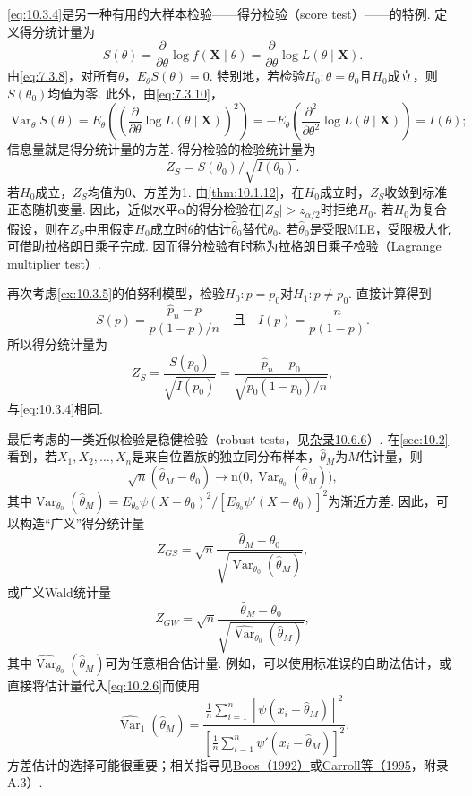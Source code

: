 \eqref{eq:10.3.4}是另一种有用的大样本检验——得分检验（score test）——的特例. 定义得分统计量为
$$S(\theta)=\frac\partial{\partial\theta}\log f(\boldsymbol X\mid\theta)=\frac\partial{\partial\theta}\log L(\theta\mid\boldsymbol X).$$
由\eqref{eq:7.3.8}，对所有$\theta$，$E_\theta S(\theta)=0$. 特别地，若检验$H_0:\theta=\theta_0$且$H_0$成立，则$S(\theta_0)$均值为零. 此外，由\eqref{eq:7.3.10}，
$$\operatorname{Var}_\theta S(\theta)=E_\theta\left(\left(\frac\partial{\partial\theta}\log L(\theta\mid\boldsymbol X)\right)^2\right)
=-E_\theta\left(\frac{\partial^2}{\partial\theta^2}\log L(\theta\mid\boldsymbol X)\right)=I(\theta);$$
信息量就是得分统计量的方差. 得分检验的检验统计量为
$$Z_S=S(\theta_0)/\sqrt{I(\theta_0)}.$$
若$H_0$成立，$Z_S$均值为0、方差为1. 由\autoref{thm:10.1.12}，在$H_0$成立时，$Z_S$收敛到标准正态随机变量. 因此，近似水平$\alpha$的得分检验在$|Z_S|>z_{\alpha/2}$时拒绝$H_0$. 若$H_0$为复合假设，则在$Z_S$中用假定$H_0$成立时$\theta$的估计$\hat\theta_0$替代$\theta_0$. 若$\hat\theta_0$是受限MLE，受限极大化可借助拉格朗日乘子完成. 因而得分检验有时称为拉格朗日乘子检验（Lagrange multiplier test）.

\begin{example}[二项得分检验]\label{ex:10.3.6}
再次考虑\autoref{ex:10.3.5}的伯努利模型，检验$H_0:p=p_0$对$H_1:p\ne p_0$. 直接计算得到
$$S(p)=\frac{\hat p_n-p}{p(1-p)/n}\quad\text{且}\quad I(p)=\frac n{p(1-p)}.$$
所以得分统计量为
$$Z_S=\frac{S(p_0)}{\sqrt{I(p_0)}}=\frac{\hat p_n-p_0}{\sqrt{p_0(1-p_0)/n}},$$
与\eqref{eq:10.3.4}相同.
\end{example}

最后考虑的一类近似检验是稳健检验（robust tests，见\hyperref[sec:10.6.6]{杂录10.6.6}）. 在\autoref{sec:10.2}看到，若$X_1,X_2,\ldots,X_n$是来自位置族的独立同分布样本，$\hat\theta_M$为$M$估计量，则
\begin{equation}\label{eq:10.3.5}
\sqrt n(\hat\theta_M-\theta_0)\longrightarrow\mathrm n\bigl(0,\operatorname{Var}_{\theta_0}(\hat\theta_M)\bigr),
\end{equation}
其中$\operatorname{Var}_{\theta_0}(\hat\theta_M)=E_{\theta_0}\psi(X-\theta_0)^2/[E_{\theta_0}\psi'(X-\theta_0)]^2$为渐近方差. 因此，可以构造“广义”得分统计量
$$Z_{GS}=\sqrt n\frac{\hat\theta_M-\theta_0}{\sqrt{\operatorname{Var}_{\theta_0}(\hat\theta_M)}},$$
或广义Wald统计量
$$Z_{GW}=\sqrt n\frac{\hat\theta_M-\theta_0}{\sqrt{\widehat{\operatorname{Var}}_{\theta_0}(\hat\theta_M)}},$$
其中$\widehat{\operatorname{Var}}_{\theta_0}(\hat\theta_M)$可为任意相合估计量. 例如，可以使用标准误的自助法估计，或直接将估计量代入\eqref{eq:10.2.6}而使用
\begin{equation}\label{eq:10.3.6}
\widehat{\operatorname{Var}}_1(\hat\theta_M)=\frac{\frac1n\sum_{i=1}^n[\psi(x_i-\hat\theta_M)]^2}{\left[\frac1n\sum_{i=1}^n\psi'(x_i-\hat\theta_M)\right]^2}.
\end{equation}
方差估计的选择可能很重要；相关指导见\hyperref[bib:source41]{Boos（1992）}或\hyperref[bib:source62]{Carroll等（1995}，附录A.3）.

